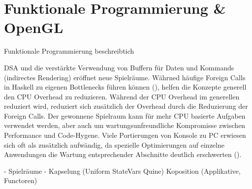 \chapter{Funktionale Programmierung \& OpenGL}
\label{chap:haskell-modern-gl}

Funktionale Programmierung beschreibtich

\ac{DSA} und die verstärkte Verwendung von Buffern für Daten und Kommands (indirectes Rendering) eröffnet neue Spielräume. Währned häufige Foreign Calls in Haskell zu eigenen Bottlenecks führen können (), helfen die Konzepte generell den CPU Overhead zu reduzieren. Während der CPU Overhead im generellen reduziert wird, reduziert sich zusätzlich der Overhead durch die Reduzierung der Foreign Calls. Der gewonnene Spielraum kann für mehr CPU basierte Aufgaben verwendet werden, aber auch um wartungsunfreundliche Kompromisse zwischen Performance und Code-Hygene. Viele Portierungen von Konsole zu PC erwiesen sich oft als zusätzlich aufwändig, da spezielle Optimierungen auf einzelne Anwendungen die Wartung entsprechender Abschnitte deutlich erschwerten ().

- Spielräume
- Kapselung (Uniform StateVars Quine) Koposition (Applikative, Functoren)
